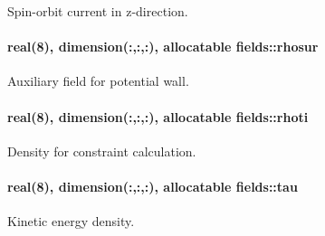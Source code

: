 Spin-\/orbit current in z-\/direction. 

\paragraph[{\texorpdfstring{rhosur}{rhosur}}]{\setlength{\rightskip}{0pt plus 5cm}real(8), dimension(\+:,\+:,\+:), allocatable fields\+::rhosur}\hypertarget{namespacefields_a02acfc4f5edd5539212bd53bbb987667}{}\label{namespacefields_a02acfc4f5edd5539212bd53bbb987667}


Auxiliary field for potential wall. 

\paragraph[{\texorpdfstring{rhoti}{rhoti}}]{\setlength{\rightskip}{0pt plus 5cm}real(8), dimension(\+:,\+:,\+:), allocatable fields\+::rhoti}\hypertarget{namespacefields_abec1aee0d60d88cce3112a0be3262af7}{}\label{namespacefields_abec1aee0d60d88cce3112a0be3262af7}


Density for constraint calculation. 

\paragraph[{\texorpdfstring{tau}{tau}}]{\setlength{\rightskip}{0pt plus 5cm}real(8), dimension(\+:,\+:,\+:), allocatable fields\+::tau}\hypertarget{namespacefields_a09947e9176ca8b0c02871ba5b3401b12}{}\label{namespacefields_a09947e9176ca8b0c02871ba5b3401b12}


Kinetic energy density. 

